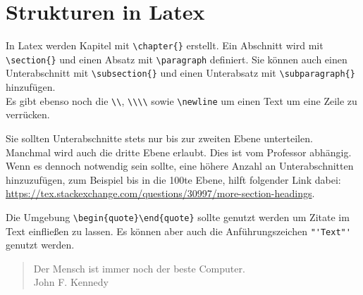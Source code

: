 \chapter{Strukturen in Latex}

In Latex werden Kapitel mit \verb+\chapter{}+ erstellt. Ein Abschnitt wird mit \verb+\section{}+ und einen Absatz mit \verb+\paragraph+ definiert. Sie können auch einen Unterabschnitt mit \verb+\subsection{}+ und einen Unterabsatz mit \verb+\subparagraph{}+ hinzufügen.\\

Es gibt ebenso noch die \verb|\\|, \verb|\\\\| sowie \verb|\newline| um einen Text um eine Zeile zu verrücken. \newline

Sie sollten Unterabschnitte stets nur bis zur zweiten Ebene unterteilen. Manchmal wird auch die dritte Ebene erlaubt. Dies ist vom Professor abhängig. Wenn es dennoch notwendig sein sollte, eine höhere Anzahl an Unterabschnitten hinzuzufügen, zum Beispiel bis in die 100te Ebene, hilft folgender Link dabei: \url{https://tex.stackexchange.com/questions/30997/more-section-headings}.\newline



Die Umgebung \verb|\begin{quote}\end{quote}| sollte genutzt werden um Zitate im Text einfließen zu lassen. Es können aber auch die Anführungszeichen \verb|"'Text"'| genutzt werden.

\begin{quote}
	Der Mensch ist immer noch der beste Computer.\\
	John F. Kennedy \cite{jfkey}
\end{quote}
